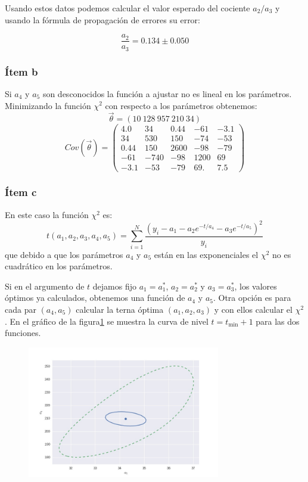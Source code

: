 Usando estos datos podemos calcular el valor esperado del cociente $a_2/a_3$ y usando la fórmula de propagación de errores su error:

$$
\frac{a_2}{a_3} = 0.134 \pm 0.050
$$

\subsubsection*{Ítem b}
Si $a_4$ y $a_5$ son desconocidos la función a ajustar no es lineal en los parámetros.
Minimizando la función $\chi^2$ con respecto a los parámetros obtenemos:
$$
\vec{\theta}=(10\ 128\ 957\  210\  34)
$$
$$
Cov(\vec{\theta}) = \left(
\begin{matrix}
4.0  & 34   &  0.44 & -61  & -3.1\\
34   & 530  & 150   & -74  & -53\\
0.44 & 150  & 2600  & -98  & -79\\
-61  & -740 & -98   & 1200 & 69\\
-3.1 & -53  & -79   & 69.  & 7.5
\end{matrix}
\right)
$$
\subsubsection*{Ítem c}
En este caso la función $\chi^2$ es:
$$
t(a_1, a_2, a_3, a_4, a_5) = \sum_{i=1}^N \frac{{\left(y_i-a_1 - a_2 e^{-t/a_4} - a_3 e^{-t/a_5}\right)}^2}{y_i}
$$
que debido a que los parámetros $a_4$ y $a_5$ están en las exponenciales el $\chi^2$ no es cuadrático en los parámetros.

Si en el argumento de $t$ dejamos fijo $a_1=a_1^*$, $a_2=a_2^*$ y $a_3=a_3^*$, los valores óptimos ya calculados, obtenemos una función de $a_4$ y $a_5$.
Otra opción es para cada par $(a_4, a_5)$ calcular la terna óptima $(a_1, a_2, a_3)$ y con ellos calcular el $\chi^2$.
En el gráfico de la figura\ref{fig:fig1} se muestra la curva de nivel $t=t_{\min} + 1$ para las dos funciones.

\begin{figure}
\centering
\includegraphics[width=0.75\textwidth]{fig1.jpg}
\caption[]{}
\label{fig:fig1}
\end{figure}


